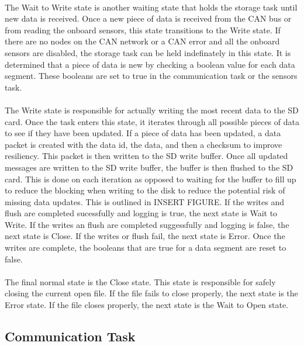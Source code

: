 \paragraph{}
The Wait to Write state is another waiting state that holds the storage task until new data is received.
Once a new piece of data is received from the CAN bus or from reading the onboard sensors, this state transitions to the Write state.
If there are no nodes on the CAN network or a CAN error and all the onboard sensors are disabled, the storage task can be held indefinately in this state.
It is determined that a piece of data is new by checking a boolean value for each data segment.
These booleans are set to true in the communication task or the sensors task.

\paragraph{}
The Write state is responsible for actually writing the most recent data to the SD card.
Once the task enters this state, it iterates through all possible pieces of data to see if they have been updated.
If a piece of data has been updated, a data packet is created with the data id, the data, and then a checksum to improve resiliency.
This packet is then written to the SD write buffer.
Once all updated messages are written to the SD write buffer, the buffer is then flushed to the SD card.
This is done on each iteration as opposed to waiting for the buffer to fill up to reduce the blocking when writing to the disk to reduce the potential risk of missing data updates.
This is outlined in INSERT FIGURE.
If the writes and flush are completed sucessfully and logging is true, the next state is Wait to Write.
If the writes an flush are completed suggessfully and logging is false, the next state is Close.
If the writes or flush fail, the next state is Error.
Once the writes are complete, the booleans that are true for a data segment are reset to false.

\paragraph{}
The final normal state is the Close state.
This state is responsible for safely closing the current open file.
If the file fails to close properly, the next state is the Error state.
If the file closes properly, the next state is the Wait to Open state.

\subsection{Communication Task}

